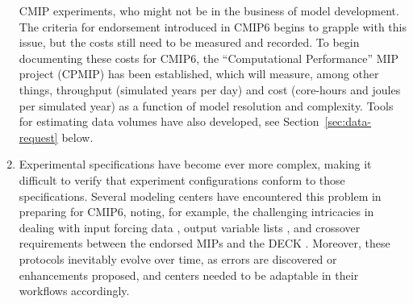 \documentclass[gmd,manuscript]{copernicus}
\begin{document}
\begin{enumerate}
  CMIP experiments, who might not be in the business of model
  development. The criteria for endorsement introduced in CMIP6
  \citep[see Table~1 in][]{ref:eyringetal2016a} begins to grapple with
  this issue, but the costs still need to be measured and recorded. To
  begin documenting these costs for CMIP6, the ``Computational
  Performance'' MIP project (CPMIP) \citep{ref:balajietal2017} has
  been established, which will
  measure, among other things, throughput (simulated years per day)
  and cost (core-hours and joules per simulated year) as a function of
  model resolution and complexity. Tools for estimating data volumes
  have also developed, see Section~\ref{sec:data-request} below.
\item\label{cmplx} Experimental specifications have become ever more
  complex, making it difficult to verify that experiment
  configurations conform to those specifications.
  Several modeling centers have encountered this problem in preparing
  for CMIP6, noting, for example, the challenging intricacies in
  dealing with input forcing data \citep[see][]{ref:duracketal2018},
  output variable lists \citep{ref:juckesetal2015}, and crossover
  requirements between the endorsed MIPs and the DECK
  \citep{ref:eyringetal2016a} . Moreover, these protocols inevitably
  evolve over time, as errors are discovered or enhancements proposed,
  and centers needed to be adaptable in their workflows accordingly.
   

\end{enumerate}
\end{document}
